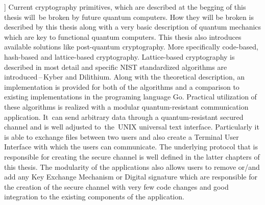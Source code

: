 ]{%
  Current cryptography primitives, which are described at the begging of this thesis will~be broken by future quantum computers. How they will be broken is described by this thesis along with a very basic description of quantum mechanics which are key to functional quantum computers. This thesis also introduces available solutions like post-quantum cryptography. More specifically code-based, hash-based and lattice-based cryptography. Lattice-based cryptography is described in most detail and specific NIST standardized algorithms are introduced\,--\,Kyber and Dilithium. Along with the theoretical description, an implementation is provided for both of the algorithms and a comparison to existing implementations in the programing language Go. Practical utilization of these algorithms is realized with a modular quantum-resistant communication application. It~can send arbitrary data through a quantum-resistant secured channel and is well adjusted to~the~UNIX universal text interface. Particularly it is able to exchange files between two users and also create a Terminal User Interface with which the users can communicate. The underlying protocol that is responsible for creating the secure channel is well defined in the latter chapters of this thesis. The modularity of the applications also allows users to remove or/and add any Key Exchange Mechanism or Digital signature which are responsible for the creation of the secure channel with very few code changes and good integration to the existing components of the application.
}


%
